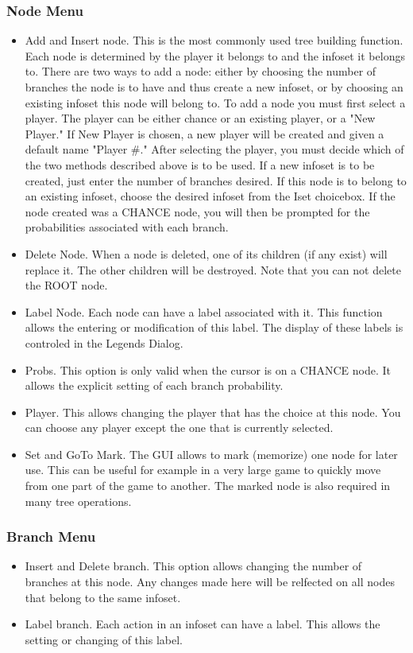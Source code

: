\subsubsection{Node Menu}
\begin{itemize}
\item Add and Insert node.  This is the most commonly used tree building
function.  Each node is determined by the player it belongs to and the
infoset it belongs to.  There are two ways to add a node: either by
choosing the number of branches the node is to have and thus create a new
infoset, or by choosing an existing infoset this node will belong to.  To
add a node you must first select a player.  The player can be either
chance or an existing player, or a "New Player."  If New Player is chosen,
a new player will be created and given a default name "Player \#." After
selecting the player, you must decide which of the two methods described
above is to be used.  If a new infoset is to be created, just enter the
number of branches desired.  If this node is to belong to an existing
infoset, choose the desired infoset from the Iset choicebox.  If the node
created was a CHANCE node, you will then be prompted for the probabilities
associated with each branch.
\item Delete Node.  When a node is deleted, one of its children (if any
exist) will replace it.  The other children will be destroyed.  Note that
you can not delete the ROOT node.
\item Label Node.  Each node can have a label associated with it. 
This function allows the entering or modification of this label.  The
display of these labels is controled in the Legends Dialog.
\item Probs.  This option is only valid when the cursor is on a
CHANCE node.  It allows the explicit setting of each branch probability.
\item Player.  This allows changing the player that has the choice
at this node.  You can choose any player except the one that is currently
selected.
\item Set and GoTo Mark.  The GUI allows to mark (memorize) one
node for later use.  This can be useful for example in a very large game
to quickly move from one part of the game to another.  The marked node is
also required in many tree operations.
\end{itemize}

\subsubsection{Branch Menu}
\begin{itemize}
\item Insert and Delete branch.  This option allows changing the
number of branches at this node.  Any changes made here will be relfected
on all nodes that belong to the same infoset.
\item Label branch.  Each action in an infoset can have a label. 
This allows the setting or changing of this label.
\end{itemize}

